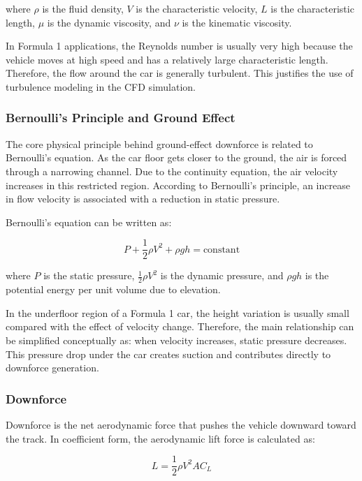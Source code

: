 \documentclass[12pt,a4paper]{article}
\begin{document}
where $\rho$ is the fluid density, $V$ is the characteristic velocity, $L$ is the characteristic
length, $\mu$ is the dynamic viscosity, and $\nu$ is the kinematic viscosity.

In Formula 1 applications, the Reynolds number is usually very high because the vehicle
moves at high speed and has a relatively large characteristic length. Therefore, the flow
around the car is generally turbulent. This justifies the use of turbulence modeling in
the CFD simulation.

\subsubsection{Bernoulli's Principle and Ground Effect}

The core physical principle behind ground-effect downforce is related to Bernoulli's
equation. As the car floor gets closer to the ground, the air is forced through a narrowing
channel. Due to the continuity equation, the air velocity increases in this restricted
region. According to Bernoulli's principle, an increase in flow velocity is associated with
a reduction in static pressure.

Bernoulli's equation can be written as:

\begin{equation}
    P + \frac{1}{2}\rho V^2 + \rho g h = \text{constant}
    \label{eq:bernoulli}
\end{equation}

where $P$ is the static pressure, $\frac{1}{2}\rho V^2$ is the dynamic pressure, and
$\rho g h$ is the potential energy per unit volume due to elevation.

In the underfloor region of a Formula 1 car, the height variation is usually small compared
with the effect of velocity change. Therefore, the main relationship can be simplified
conceptually as: when velocity increases, static pressure decreases. This pressure drop
under the car creates suction and contributes directly to downforce generation.

\subsubsection{Downforce}

Downforce is the net aerodynamic force that pushes the vehicle downward toward the
track. In coefficient form, the aerodynamic lift force is calculated as:

\begin{equation}
    L = \frac{1}{2}\rho V^2 A C_L
    \label{eq:lift_coefficient}
\end{equation}
\end{document}
